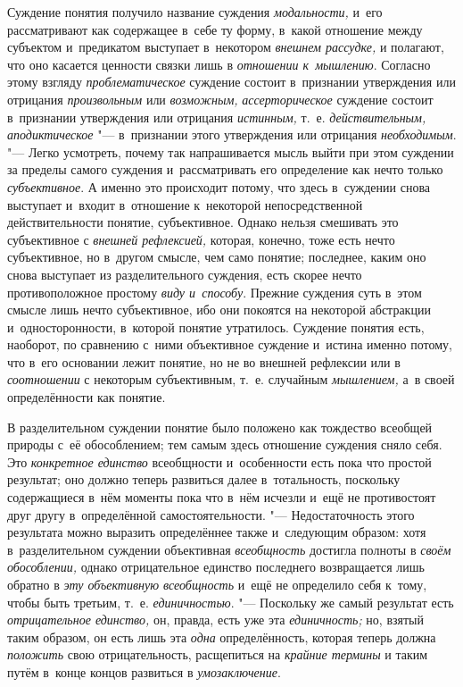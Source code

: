 Суждение понятия получило название суждения
{\em модальности,} и~его
рассматривают как содержащее в~себе ту форму, в~какой отношение между
субъектом и~предикатом выступает в~некотором
{\em внешнем рассудке,} и
полагают, что оно касается ценности связки лишь в
{\em отношении к~мышлению}.
Согласно этому взгляду
{\em проблематическое}
суждение состоит в~признании утверждения или отрицания
{\em произвольным} или
{\em возможным,}
{\em ассерторическое}
суждение состоит в~признании утверждения или отрицания
{\em истинным,} т.~е.
{\em действительным,}
{\em аподиктическое} "--- в~признании этого утверждения или отрицания
{\em необходимым}. "---
Легко усмотреть, почему так напрашивается мысль выйти при
этом суждении за пределы самого суждения и~рассматривать его определение
как нечто только {\em субъективное}.
А именно это происходит потому, что здесь в~суждении снова
выступает и~входит в~отношение к~некоторой непосредственной
действительности понятие, субъективное. Однако нельзя смешивать это
субъективное с {\em внешней
рефлексией,} которая, конечно, тоже есть нечто субъективное,
но в~другом смысле, чем само понятие; последнее, каким оно снова выступает
из разделительного суждения, есть скорее нечто противоположное простому
{\em виду и~способу}.
Прежние суждения суть в~этом смысле лишь нечто субъективное,
ибо они покоятся на некоторой абстракции и~односторонности, в~которой
понятие утратилось. Суждение понятия есть, наоборот, по сравнению с~ними
объективное суждение и~истина именно потому, что в~его основании лежит
понятие, но не во внешней рефлексии или в
{\em соотношении} с
некоторым субъективным, т.~е. случайным
{\em мышлением,} а~в
своей определённости как понятие.

В разделительном суждении понятие было положено как тождество
всеобщей природы с~её обособлением; тем самым здесь отношение суждения
сняло себя. Это {\em конкретное
единство} всеобщности и~особенности есть пока что простой
результат; оно должно теперь развиться далее в~тотальность, поскольку
содержащиеся в~нём моменты пока что в~нём исчезли и~ещё не противостоят
друг другу в~определённой самостоятельности. "---
Недостаточность этого результата можно выразить определённее
также и~следующим образом: хотя в~разделительном суждении объективная
{\em всеобщность}
достигла полноты в
{\em своём обособлении,}
однако отрицательное единство последнего возвращается лишь
обратно в {\em эту объективную
всеобщность} и~ещё не определило себя к~тому, чтобы быть
третьим, т.~е. {\em единичностью}. "---
Поскольку же самый результат есть
{\em отрицательное единство,}
он, правда, есть уже эта
{\em единичность;} но,
взятый таким образом, он есть лишь эта
{\em одна}
определённость, которая теперь должна
{\em положить} свою
отрицательность, расщепиться на
{\em крайние термины} и
таким путём в~конце концов развиться в
{\em умозаключение}.

